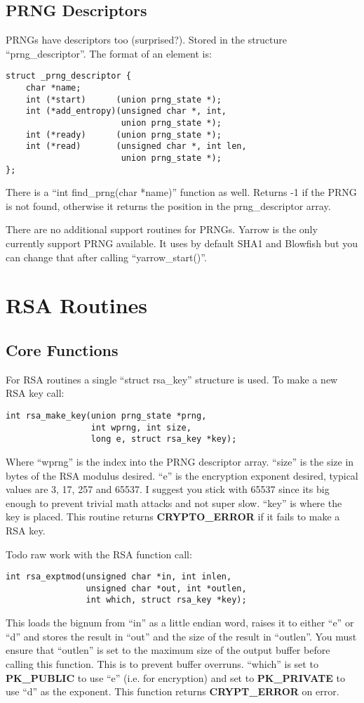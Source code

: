 \documentclass{book}
\begin{document}
\section{PRNG Descriptors}

PRNGs have descriptors too (surprised?). Stored in the structure ``prng\_descriptor''.  The format of an element is:
\begin{verbatim}
struct _prng_descriptor {
    char *name;
    int (*start)      (union prng_state *);
    int (*add_entropy)(unsigned char *, int, 
                       union prng_state *);
    int (*ready)      (union prng_state *);
    int (*read)       (unsigned char *, int len, 
                       union prng_state *);
};
\end{verbatim}

There is a ``int find\_prng(char *name)'' function as well.  Returns -1 if the PRNG is not found, otherwise it returns
the position in the prng\_descriptor array.

There are no additional support routines for PRNGs.  Yarrow is the only currently support PRNG available.  It uses by 
default SHA1 and Blowfish but you can change that after calling ``yarrow\_start()''.

\chapter{RSA Routines}
\section{Core Functions}

For RSA routines a single ``struct rsa\_key'' structure is used.  To make a new RSA key call:
\begin{verbatim}
int rsa_make_key(union prng_state *prng, 
                 int wprng, int size, 
                 long e, struct rsa_key *key);
\end{verbatim}

Where ``wprng'' is the index into the PRNG descriptor array.  ``size'' is the size in bytes of the RSA modulus desired.
``e'' is the encryption exponent desired, typical values are 3, 17, 257 and 65537.  I suggest you stick with 65537 since its big
enough to prevent trivial math attacks and not super slow.  ``key'' is where the key is placed.  This routine returns
{\bf CRYPTO\_ERROR} if it fails to make a RSA key.

Todo raw work with the RSA function call:
\begin{verbatim}
int rsa_exptmod(unsigned char *in, int inlen, 
                unsigned char *out, int *outlen, 
                int which, struct rsa_key *key);
\end{verbatim}
This loads the bignum from ``in'' as a little endian word, raises it to either ``e'' or ``d'' and stores the result
in ``out'' and the size of the result in ``outlen''.  You must ensure that ``outlen'' is set to the maximum size of
the output buffer before calling this function.  This is to prevent buffer overruns.  ``which'' is set to 
{\bf PK\_PUBLIC} to use ``e'' (i.e. for encryption) and set to {\bf PK\_PRIVATE} to use ``d'' as the exponent.  This
function returns {\bf CRYPT\_ERROR} on error.
\end{document}
